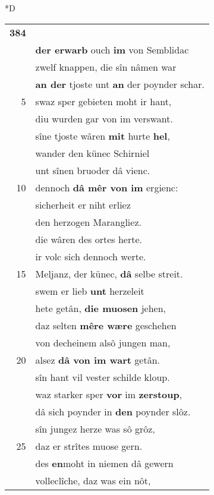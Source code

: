 \documentclass[8pt,a4paper,notitlepage]{article}
\begin{document}
\begin{table}[ht]
\begin{minipage}[t]{0.5\linewidth}
\small
\begin{center}*D
\end{center}
\begin{tabular}{rl}
\textbf{384} & \textit{\begin{large}M\end{large}}elyanze \textbf{er} helfe sich bewac.\\ 
 & \textbf{der erwarb} ouch \textbf{im} von Semblidac\\ 
 & zwelf knappen, die sîn nâmen war\\ 
 & \textbf{an der} tjoste unt \textbf{an} der poynder schar.\\ 
5 & swaz sper gebieten moht ir hant,\\ 
 & diu wurden gar von im verswant.\\ 
 & sîne tjoste wâren \textbf{mit} hurte \textbf{hel},\\ 
 & wander den künec Schirniel\\ 
 & unt sînen bruoder dâ vienc.\\ 
10 & dennoch \textbf{dâ mêr von im} ergienc:\\ 
 & sicherheit er niht erliez\\ 
 & den herzogen Marangliez.\\ 
 & die wâren des ortes herte.\\ 
 & ir volc sich dennoch werte.\\ 
15 & Meljanz, der künec, \textbf{dâ} selbe streit.\\ 
 & swem er lieb \textbf{unt} herzeleit\\ 
 & hete getân, \textbf{die muosen} jehen,\\ 
 & daz selten \textbf{mêre wære} geschehen\\ 
 & von decheinem alsô jungen man,\\ 
20 & alsez \textbf{dâ von im wart} getân.\\ 
 & sîn hant vil vester schilde kloup.\\ 
 & waz starker sper \textbf{vor} im \textbf{zerstoup},\\ 
 & dâ sich poynder in \textbf{den} poynder slôz.\\ 
 & sîn jungez herze was sô grôz,\\ 
25 & daz er strîtes muose gern.\\ 
 & des \textbf{en}moht in niemen dâ gewern\\ 
 & volleclîche, daz was ein nôt,\\ 

\end{tabular}
\end{minipage}
\end{table}
\end{document}
